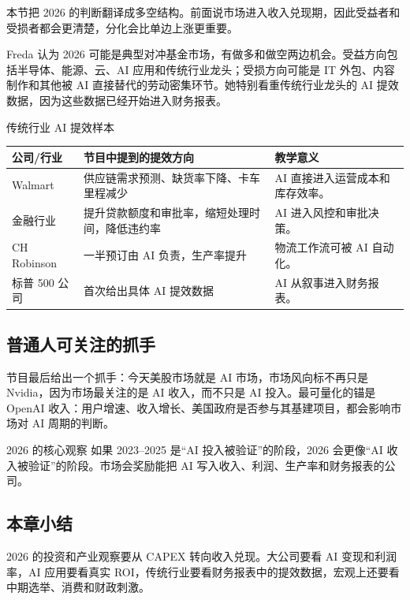 本节把 2026 的判断翻译成多空结构。前面说市场进入收入兑现期，因此受益者和受损者都会更清楚，分化会比单边上涨更重要。

Freda 认为 2026 可能是典型对冲基金市场，有做多和做空两边机会。受益方向包括半导体、能源、云、AI 应用和传统行业龙头；受损方向可能是 IT 外包、内容制作和其他被 AI 直接替代的劳动密集环节。她特别看重传统行业龙头的 AI 提效数据，因为这些数据已经开始进入财务报表。

\begin{knowledgebox}{传统行业 AI 提效样本}
\begin{tabularx}{\textwidth}{p{}p{}X}
\toprule
公司/行业 & 节目中提到的提效方向 & 教学意义 \\
\midrule
Walmart & 供应链需求预测、缺货率下降、卡车里程减少 & AI 直接进入运营成本和库存效率。 \\
金融行业 & 提升贷款额度和审批率，缩短处理时间，降低违约率 & AI 进入风控和审批决策。 \\
CH Robinson & 一半预订由 AI 负责，生产率提升 & 物流工作流可被 AI 自动化。 \\
标普 500 公司 & 首次给出具体 AI 提效数据 & AI 从叙事进入财务报表。 \\
\bottomrule
\end{tabularx}
\end{knowledgebox}

\subsection{普通人可关注的抓手}

节目最后给出一个抓手：今天美股市场就是 AI 市场，市场风向标不再只是 Nvidia，因为市场最关注的是 AI 收入，而不只是 AI 投入。最可量化的锚是 OpenAI 收入：用户增速、收入增长、美国政府是否参与其基建项目，都会影响市场对 AI 周期的判断。

\begin{importantbox}{2026 的核心观察}
如果 2023--2025 是“AI 投入被验证”的阶段，2026 会更像“AI 收入被验证”的阶段。市场会奖励能把 AI 写入收入、利润、生产率和财务报表的公司。
\end{importantbox}

\subsection{本章小结}

2026 的投资和产业观察要从 CAPEX 转向收入兑现。大公司要看 AI 变现和利润率，AI 应用要看真实 ROI，传统行业要看财务报表中的提效数据，宏观上还要看中期选举、消费和财政刺激。

